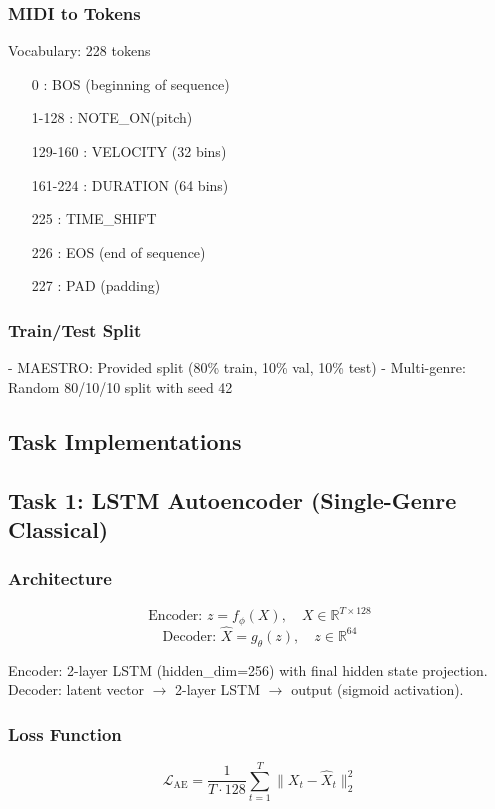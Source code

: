 \documentclass[conference]{IEEEtran}
\begin{document}
\subsubsection{MIDI to Tokens}
Vocabulary: 228 tokens
\begin{itemize}
\item [0]: BOS (beginning of sequence)
\item [1-128]: NOTE\_ON(pitch) 
\item [129-160]: VELOCITY (32 bins)
\item [161-224]: DURATION (64 bins)
\item [225]: TIME\_SHIFT
\item [226]: EOS (end of sequence)
\item [227]: PAD (padding)
\end{itemize}

\subsubsection{Train/Test Split}
- MAESTRO: Provided split (80\% train, 10\% val, 10\% test)
- Multi-genre: Random 80/10/10 split with seed 42

\subsection{Task Implementations}
\label{subsec:tasks}

\subsection{Task 1: LSTM Autoencoder (Single-Genre Classical)}

\subsubsection{Architecture}
\begin{equation}
\text{Encoder: } z = f_\phi(X), \quad X \in \mathbb{R}^{T \times 128}
\end{equation}
\begin{equation}
\text{Decoder: } \hat{X} = g_\theta(z), \quad z \in \mathbb{R}^{64}
\end{equation}

Encoder: 2-layer LSTM (hidden\_dim=256) with final hidden state projection.
Decoder: latent vector $\to$ 2-layer LSTM $\to$ output (sigmoid activation).

\subsubsection{Loss Function}
\begin{equation}
\mathcal{L}_{\text{AE}} = \frac{1}{T \cdot 128} \sum_{t=1}^{T} \|X_t - \hat{X}_t\|_2^2
\end{equation}
\end{document}
